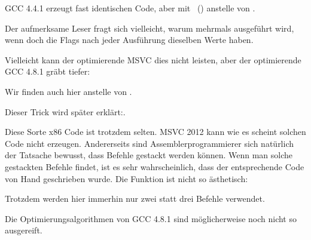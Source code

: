 
\NonOptimizing GCC 4.4.1 
erzeugt fast identischen Code, aber mit \puts~() anstelle von \printf.

Der aufmerksame Leser fragt sich vielleicht, warum \CMP mehrmals ausgeführt wird, wenn doch die Flags nach jeder
Ausführung dieselben Werte haben. 

Vielleicht kann der optimierende MSVC dies nicht leisten, aber der optimierende GCC 4.8.1 gräbt tiefer:



Wir finden auch hier  anstelle von .

Dieser Trick wird später erklärt:.

Diese Sorte x86 Code ist trotzdem selten. MSVC 2012 kann wie es scheint solchen Code nicht erzeugen.
Andererseits sind Assemblerprogrammierer sich natürlich der Tatsache bewusst, dass  Befehle gestackt werden
können.
Wenn man solche gestackten Befehle findet, ist es sehr wahrscheinlich, dass der entsprechende Code von Hand geschrieben
wurde. 
Die Funktion  ist nicht so ästhetisch:



Trotzdem werden hier immerhin nur zwei statt drei  Befehle verwendet.

Die Optimierungsalgorithmen von GCC 4.8.1 sind möglicherweise noch nicht so ausgereift.
